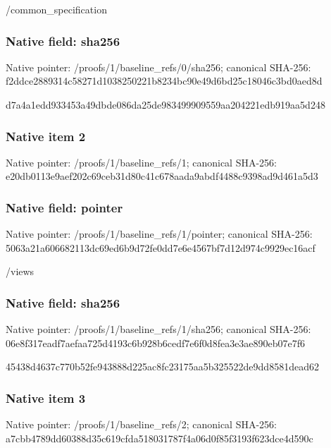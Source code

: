 \documentclass[10pt,a4paper]{article}
\begin{document}
\begingroup\raggedright\sloppy /\allowbreak{}common\_\allowbreak{}specification\par\endgroup

\subsubsection{Native field: sha256}
Native pointer: /proofs/1/baseline\_\allowbreak{}refs/0/sha256; canonical SHA-256: f2ddce2889314c58271d1038250221b8234bc90e49d6bd25c18046c3bd0aed8d

\begingroup\raggedright\sloppy d7a4a1edd933453a49dbde086da25de983499909559aa204221edb919aa5d248\par\endgroup

\subsubsection{Native item 2}
Native pointer: /proofs/1/baseline\_\allowbreak{}refs/1; canonical SHA-256: e20db0113e9aef202c69ceb31d80c41c678aada9abdf4488c9398ad9d461a5d3

\subsubsection{Native field: pointer}
Native pointer: /proofs/1/baseline\_\allowbreak{}refs/1/pointer; canonical SHA-256: 5063a21a606682113dc69ed6b9d72fe0dd7e6e4567bf7d12d974c9929ec16acf

\begingroup\raggedright\sloppy /\allowbreak{}views\par\endgroup

\subsubsection{Native field: sha256}
Native pointer: /proofs/1/baseline\_\allowbreak{}refs/1/sha256; canonical SHA-256: 06e8f317eadf7aefaa725d4193c6b928b6cedf7e6f0d8fea3e3ae890eb07e7f6

\begingroup\raggedright\sloppy 45438d4637c770b52fe943888d225ac8fc23175aa5b325522de9dd8581dead62\par\endgroup

\subsubsection{Native item 3}
Native pointer: /proofs/1/baseline\_\allowbreak{}refs/2; canonical SHA-256: a7cbb4789dd60388d35c619cfda518031787f4a06d0f85f3193f623dce4d590c
\end{document}
